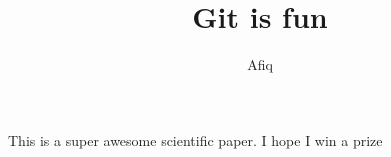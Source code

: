 \documentclass[10pt]{article}
\author{Afiq}
\title{Git is fun}
\begin{document}
	\maketitle

	This is a super awesome scientific paper.
	I hope I win a prize
\end{document}
